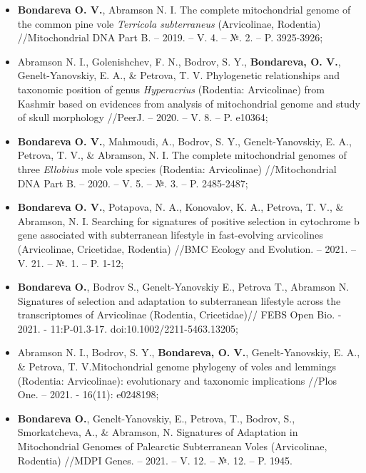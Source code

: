 \begin{itemize} 
\item[\textbullet] \textbf{Bondareva O. V.}, Abramson N. I. The complete mitochondrial genome of the common pine vole \textit{Terricola subterraneus} (Arvicolinae, Rodentia) //Mitochondrial DNA Part B. – 2019. – V. 4. – №. 2. – P. 3925-3926;
\item[\textbullet] Abramson N. I., Golenishchev, F. N., Bodrov, S. Y., \textbf{Bondareva, O. V.}, Genelt-Yanovskiy, E. A., \& Petrova, T. V. Phylogenetic relationships and taxonomic position of genus \textit{Hyperacrius} (Rodentia: Arvicolinae) from Kashmir based on evidences from analysis of mitochondrial genome and study of skull morphology //PeerJ. – 2020. – V. 8. – P. e10364;
\item[\textbullet] \textbf{Bondareva O. V.}, Mahmoudi, A., Bodrov, S. Y., Genelt-Yanovskiy, E. A., Petrova, T. V., \& Abramson, N. I. The complete mitochondrial genomes of three \textit{Ellobius} mole vole species (Rodentia: Arvicolinae) //Mitochondrial DNA Part B. – 2020. – V. 5. – №. 3. – P. 2485-2487; 
\item[\textbullet] \textbf{Bondareva O. V.}, Potapova, N. A., Konovalov, K. A., Petrova, T. V., \& Abramson, N. I. Searching for signatures of positive selection in cytochrome b gene associated with subterranean lifestyle in fast-evolving arvicolines (Arvicolinae, Cricetidae, Rodentia) //BMC Ecology and Evolution. – 2021. – V. 21. – №. 1. – P. 1-12;
\item[\textbullet] \textbf{Bondareva O.}, Bodrov S., Genelt-Yanovskiy E., Petrova T., Abramson N. Signatures of selection and adaptation to subterranean lifestyle across the transcriptomes of Arvicolinae (Rodentia, Cricetidae)// FEBS Open Bio. - 2021. - 11:P-01.3-17. doi:10.1002/2211-5463.13205;
\item[\textbullet] Abramson N. I., Bodrov, S. Y., \textbf{Bondareva, O. V.}, Genelt-Yanovskiy, E. A., \& Petrova, T. V.Mitochondrial genome phylogeny of voles and lemmings (Rodentia: Arvicolinae): evolutionary and taxonomic implications //Plos One. – 2021. - 16(11): e0248198;
\item[\textbullet]  \textbf{Bondareva O.}, Genelt-Yanovskiy, E., Petrova, T., Bodrov, S., Smorkatcheva, A., \& Abramson, N.  Signatures of Adaptation in Mitochondrial Genomes of Palearctic Subterranean Voles (Arvicolinae, Rodentia) //MDPI Genes. – 2021. – V. 12. – №. 12. – P. 1945.
\end{itemize}


